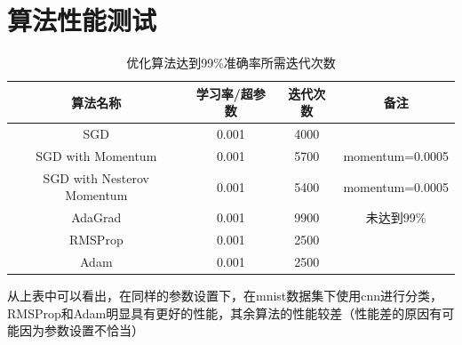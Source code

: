\documentclass[a4paper, UTF8]{ctexrep}
\begin{document}
		\section{算法性能测试}
			\begin{table}[htbp!]
				\centering
				\begin{tabular}{cccc}
					\hline
					算法名称 & 学习率/超参数 & 迭代次数 & 备注 \\
					\hline
					SGD & 0.001 & 4000 &   \\
					SGD with Momentum & 0.001 & 5700 & momentum=0.0005 \\
					SGD with Nesterov Momentum & 0.001 & 5400 & momentum=0.0005 \\
					AdaGrad & 0.001 & 9900 & 未达到99\% \\
					RMSProp & 0.001 & 2500 &   \\
					Adam & 0.001 & 2500 &   \\
					\hline
				\end{tabular}
				\caption{优化算法达到99\%准确率所需迭代次数}
			\end{table}
			从上表中可以看出，在同样的参数设置下，在mnist数据集下使用cnn进行分类，RMSProp和Adam明显具有更好的性能，其余算法的性能较差（性能差的原因有可能因为参数设置不恰当）
			\clearpage
\end{document}
